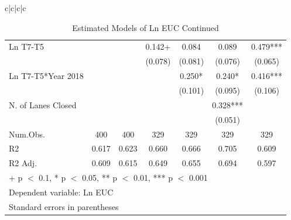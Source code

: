 \documentclass[
  letterpaper,
  authoryear]{elsarticle}
\begin{document}
\begin{table}
{\begin{tabular}[t]{c|c|c|c}
\begin{table}
\begin{table}
{\begin{tabular}[t]{lcccccc}
Ln T7-T5 &  &  & 0.142+ & 0.084 & 0.089 & 0.479***\\
 &  &  & (0.078) & (0.081) & (0.076) & (0.065)\\
Ln T7-T5*Year 2018 &  &  &  & 0.250* & 0.240* & 0.416***\\
 &  &  &  & (0.101) & (0.095) & (0.106)\\
N. of Lanes Closed &  &  &  &  & 0.328*** & \\
 &  &  &  &  & (0.051) & \\
\midrule
Num.Obs. & 400 & 400 & 329 & 329 & 329 & 329\\
R2 & 0.617 & 0.623 & 0.660 & 0.666 & 0.705 & 0.609\\
R2 Adj. & 0.609 & 0.615 & 0.649 & 0.655 & 0.694 & 0.597\\
\bottomrule
\multicolumn{7}{l}{\rule{0pt}{1em}+ p $<$ 0.1, * p $<$ 0.05, ** p $<$ 0.01, *** p $<$ 0.001}\\
\multicolumn{7}{l}{\rule{0pt}{1em}Dependent variable: Ln EUC}\\
\multicolumn{7}{l}{\rule{0pt}{1em}Standard errors in parentheses}\\
\end{tabular}

}

\end{table}%

\begin{table}

\caption{\label{tbl-eucmodels2}Estimated Models of Ln EUC Continued}

\centering{

}
\end{table}
\end{table}
\end{tabular}}
\end{table}
\end{document}
